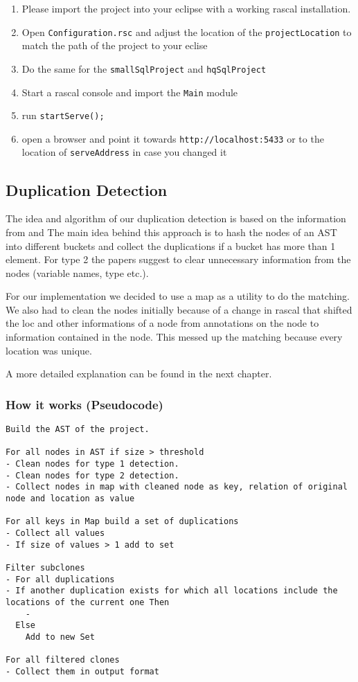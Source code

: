 \documentclass{uva-inf-article}
\begin{document}
\begin{enumerate}

\item
  Please import the project into your eclipse with a working rascal
  installation.
\item
  Open \texttt{Configuration.rsc} and adjust the location of the
  \texttt{projectLocation} to match the path of the project to your
  eclise
\item
  Do the same for the \texttt{smallSqlProject} and \texttt{hqSqlProject}
\item
  Start a rascal console and import the \texttt{Main} module
\item
  run \texttt{startServe();}
\item
  open a browser and point it towards \texttt{http://localhost:5433} or
  to the location of \texttt{serveAddress} in case you changed it
\end{enumerate}

\subsection{Duplication Detection}

The idea and algorithm of our duplication detection is based on the
information from \cite{lazar2014clone} and \cite{baxter1998clone} The main idea behind this approach
is to hash the nodes of an AST into different buckets and collect the
duplications if a bucket has more than 1 element. For type 2 the papers
suggest to clear unnecessary information from the nodes (variable names,
type etc.).

For our implementation we decided to use a map as a utility to do the
matching. We also had to clean the nodes initially because of a change
in rascal that shifted the loc and other informations of a node from
annotations on the node to information contained in the node. This
messed up the matching because every location was unique.

A more detailed explanation can be found in the next chapter.

\subsubsection{How it works (Pseudocode)}

\begin{verbatim}
Build the AST of the project.

For all nodes in AST if size > threshold
- Clean nodes for type 1 detection.
- Clean nodes for type 2 detection.
- Collect nodes in map with cleaned node as key, relation of original node and location as value

For all keys in Map build a set of duplications
- Collect all values
- If size of values > 1 add to set

Filter subclones
- For all duplications
- If another duplication exists for which all locations include the locations of the current one Then
    -
  Else
    Add to new Set
    
For all filtered clones
- Collect them in output format
\end{verbatim}
\end{document}

